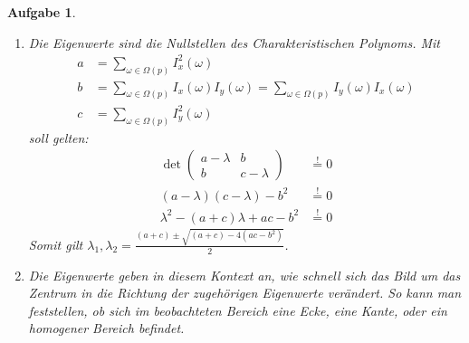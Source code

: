 \documentclass[11pt]{article}
\theoremstyle{break}
\newtheorem{task}{Aufgabe}
\begin{document}
\begin{task}
\begin{enumerate}[label={\alph*)}]
\begin{align*}
            \underbrace{v_i^T C_p v_i}_{\geq 0} &= \lambda_i v_i^T v_i = \lambda_i \underbrace{v_i^2}_{\geq 0}
        \end{align*}
        Dadurch gilt auch $\lambda_i \geq 0 \qed$
        \item Die Eigenwerte sind die Nullstellen des Charakteristischen Polynoms. Mit 
        \begin{align*}
            a &= \sum\limits_{\omega \in \Omega(p)} I^2_x (\omega)\\
            b &= \sum\limits_{\omega \in \Omega(p)} I_x (\omega) I_y (\omega) = \sum\limits_{\omega \in \Omega(p)} I_y (\omega) I_x (\omega)\\
            c &= \sum\limits_{\omega \in \Omega(p)} I^2_y (\omega)
        \end{align*}
        soll gelten:
        \begin{align*}
            \det \begin{pmatrix}
                a - \lambda & b\\
                b & c - \lambda
            \end{pmatrix} &\stackrel{!}{=} 0\\
            (a - \lambda)(c - \lambda) - b^2 &\stackrel{!}{=} 0\\
            \lambda^2 - (a + c)\lambda + ac - b^2 &\stackrel{!}{=} 0
        \end{align*}
        Somit gilt $\lambda_1, \lambda_2 = \frac{(a + c) \pm \sqrt{(a + c) - 4(ac - b^2)}}{2}$.
        \item Die Eigenwerte geben in diesem Kontext an, wie schnell sich das Bild um das Zentrum in die Richtung der zugehörigen Eigenwerte verändert. So kann man feststellen, ob sich im beobachteten Bereich eine Ecke, eine Kante, oder ein homogener Bereich befindet.
    \end{enumerate}
\end{task}
\end{document}

